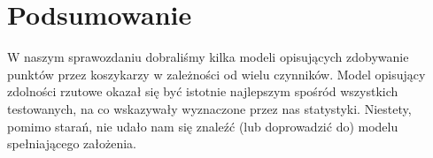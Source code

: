 \documentclass[11pt,a4paper]{article}
\begin{document}
\section{Podsumowanie}
W naszym sprawozdaniu dobraliśmy kilka modeli opisujących zdobywanie punktów przez koszykarzy w zależności od wielu czynników. Model opisujący zdolności rzutowe okazał się być istotnie najlepszym spośród wszystkich testowanych, na co wskazywały wyznaczone przez nas statystyki. Niestety, pomimo starań, nie udało nam się znaleźć (lub doprowadzić do) modelu spełniającego założenia.
\end{document}

